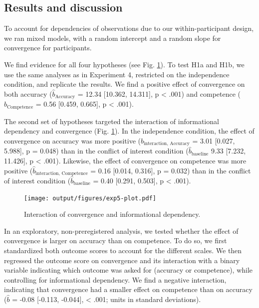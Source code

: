 \documentclass[
  doc,floatsintext]{apa6}
\begin{document}
\subsection{Results and discussion}\label{results-and-discussion-4}

To account for dependencies of observations due to our within-participant design, we ran mixed models, with a random intercept and a random slope for convergence for participants.

We find evidence for all four hypotheses (see Fig. \ref{fig:exp5-plot}). To test H1a and H1b, we use the same analyses as in Experiment 4, restricted on the independence condition, and replicate the results. We find a positive effect of convergence on both accuracy (\(\hat{b}_{\text{Accuracy}}\) = 12.34 {[}10.362, 14.311{]}, p \textless{} .001) and competence (\(\hat{b}_{\text{Competence}}\) = 0.56 {[}0.459, 0.665{]}, p \textless{} .001).

The second set of hypotheses targeted the interaction of informational dependency and convergence (Fig. \ref{fig:exp5-plot}). In the independence condition, the effect of convergence on accuracy was more positive (\(\hat{b}_{\text{interaction, Accuracy}}\) = 3.01 {[}0.027, 5.988{]}, p = 0.048) than in the conflict of interest condition (\(\hat{b}_{\text{baseline}}\) 9.33 {[}7.232, 11.426{]}, p \textless{} .001). Likewise, the effect of convergence on competence was more positive (\(\hat{b}_{\text{interaction, Competence}}\) = 0.16 {[}0.014, 0.316{]}, p = 0.032) than in the conflict of interest condition (\(\hat{b}_{\text{baseline}}\) = 0.40 {[}0.291, 0.503{]}, p \textless{} .001).



\begin{figure}
\centering
\texttt{[image: output/figures/exp5-plot.pdf]}
\caption{\label{fig:exp5-plot}Interaction of convergence and informational dependency.}
\end{figure}

In an exploratory, non-preregistered analysis, we tested whether the effect of convergence is larger on accuracy than on competence. To do so, we first standardized both outcome scores to account for the different scales. We then regressed the outcome score on convergence and its interaction with a binary variable indicating which outcome was asked for (accuracy or competence), while controlling for informational dependency. We find a negative interaction, indicating that convergence had a smaller effect on competence than on accuracy (\(\hat{b}\) = -0.08 {[}-0.113, -0.044{]}, \textless{} .001; units in standard deviations).
\end{document}
